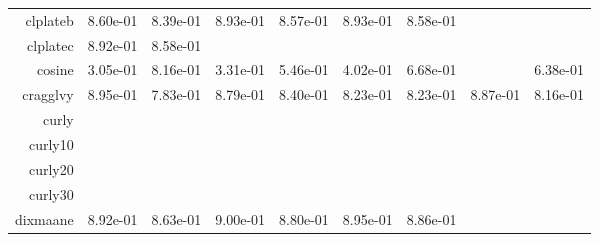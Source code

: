 \begin{tabular}{rrrrrrrrr}
  clplateb &  8.60e-01 &  8.39e-01 &  8.93e-01 &  8.57e-01 &  8.93e-01 &  8.58e-01 & \cellcolor{black}{\color{white}{ 8.95e-01}} & \cellcolor{black}{\color{white}{ 8.60e-01}} \\
  clplatec &  8.92e-01 &  8.58e-01 & \cellcolor{black}{\color{white}{ 8.92e-01}} & \cellcolor{black}{\color{white}{ 8.56e-01}} & \cellcolor{black}{\color{white}{ 8.92e-01}} & \cellcolor{black}{\color{white}{ 8.56e-01}} & \cellcolor{black}{\color{white}{ 8.93e-01}} & \cellcolor{black}{\color{white}{ 8.77e-01}} \\
  cosine &  3.05e-01 &  8.16e-01 &  3.31e-01 &  5.46e-01 &  4.02e-01 &  6.68e-01 & \cellcolor{black}{\color{white}{ 5.24e-01}} &  6.38e-01 \\
  cragglvy &  8.95e-01 &  7.83e-01 &  8.79e-01 &  8.40e-01 &  8.23e-01 &  8.23e-01 &  8.87e-01 &  8.16e-01 \\
  curly & \cellcolor{black}{\color{white}{ 8.94e-01}} & \cellcolor{black}{\color{white}{ 8.58e-01}} & \cellcolor{black}{\color{white}{ 8.92e-01}} & \cellcolor{black}{\color{white}{ 8.58e-01}} & \cellcolor{black}{\color{white}{ 8.92e-01}} & \cellcolor{black}{\color{white}{ 8.58e-01}} & \cellcolor{black}{\color{white}{ 8.93e-01}} & \cellcolor{black}{\color{white}{ 8.59e-01}} \\
  curly10 & \cellcolor{black}{\color{white}{ 8.94e-01}} & \cellcolor{black}{\color{white}{ 8.58e-01}} & \cellcolor{black}{\color{white}{ 8.92e-01}} & \cellcolor{black}{\color{white}{ 8.63e-01}} & \cellcolor{black}{\color{white}{ 8.89e-01}} & \cellcolor{black}{\color{white}{ 8.66e-01}} & \cellcolor{black}{\color{white}{ 8.78e-01}} & \cellcolor{black}{\color{white}{ 8.79e-01}} \\
  curly20 & \cellcolor{black}{\color{white}{ 8.92e-01}} & \cellcolor{black}{\color{white}{ 8.58e-01}} & \cellcolor{black}{\color{white}{ 8.93e-01}} & \cellcolor{black}{\color{white}{ 8.65e-01}} & \cellcolor{black}{\color{white}{ 8.94e-01}} & \cellcolor{black}{\color{white}{ 8.72e-01}} & \cellcolor{black}{\color{white}{ 8.81e-01}} & \cellcolor{black}{\color{white}{ 8.57e-01}} \\
  curly30 & \cellcolor{black}{\color{white}{ 8.93e-01}} & \cellcolor{black}{\color{white}{ 8.59e-01}} & \cellcolor{black}{\color{white}{ 8.95e-01}} & \cellcolor{black}{\color{white}{ 8.62e-01}} & \cellcolor{black}{\color{white}{ 8.96e-01}} & \cellcolor{black}{\color{white}{ 8.74e-01}} & \cellcolor{black}{\color{white}{ 8.92e-01}} & \cellcolor{black}{\color{white}{ 8.83e-01}} \\
  dixmaane &  8.92e-01 &  8.63e-01 &  9.00e-01 &  8.80e-01 &  8.95e-01 &  8.86e-01 & \cellcolor{black}{\color{white}{ 8.88e-01}} & \cellcolor{black}{\color{white}{ 8.87e-01}} \\

\end{tabular}
